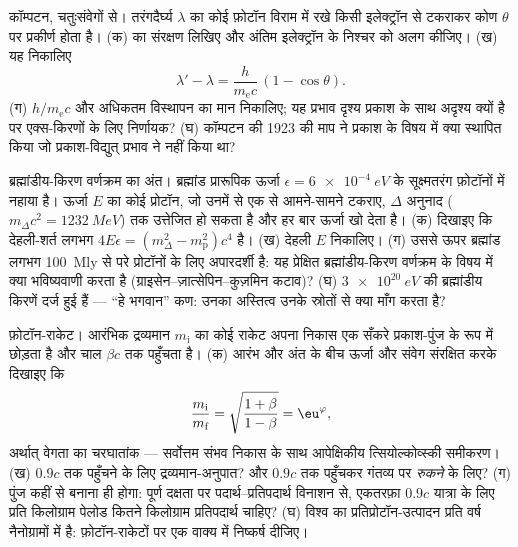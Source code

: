 \begin{exercise}[$\star\star\star$]\label{exo:b3:relativistic-dynamics:10}
कॉम्पटन, चतुःसंवेगों से। तरंगदैर्घ्य $\lambda$ का कोई फ़ोटॉन विराम में
रखे किसी इलेक्ट्रॉन से टकराकर कोण $\theta$ पर प्रकीर्ण होता है। (क)
 का संरक्षण लिखिए और अंतिम इलेक्ट्रॉन के
निश्चर को अलग कीजिए। (ख) यह निकालिए
\[
\lambda' - \lambda = \frac{h}{m_{\text{e}}c}\,(1 - \cos\theta) .
\]
(ग) $h/m_{\text{e}}c$ और अधिकतम विस्थापन का मान निकालिए; यह प्रभाव
दृश्य प्रकाश के साथ अदृश्य क्यों है पर एक्स-किरणों के लिए निर्णायक?
(घ) कॉम्पटन की 1923 की माप ने प्रकाश के विषय में क्या स्थापित किया जो
प्रकाश-विद्युत् प्रभाव ने नहीं किया था?
\end{exercise}

\begin{exercise}[$\star\star\star$]\label{exo:b3:relativistic-dynamics:11}
ब्रह्मांडीय-किरण वर्णक्रम का अंत। ब्रह्मांड प्रारूपिक ऊर्जा
$\epsilon = \qty{6e-4}{eV}$ के सूक्ष्मतरंग फ़ोटॉनों में नहाया है।
ऊर्जा $E$ का कोई प्रोटॉन, जो उनमें से एक से आमने-सामने टकराए,
$\Delta$ अनुनाद ($m_\Delta c^2 = \qty{1232}{MeV}$) तक उत्तेजित हो
सकता है और हर बार ऊर्जा खो देता है। (क) दिखाइए कि देहली-शर्त लगभग
$4E\epsilon =
(m_\Delta^2 - m_{\text{p}}^2)c^4$ है। (ख) देहली $E$ निकालिए।
(ग) उससे ऊपर ब्रह्मांड लगभग \qty{100}{Mly} से परे प्रोटॉनों के लिए
अपारदर्शी है: यह प्रेक्षित ब्रह्मांडीय-किरण वर्णक्रम के विषय में क्या
भविष्यवाणी करता है (ग्राइसेन--ज़ात्सेपिन--कुज़मिन कटाव)? (घ)
$\qty{3e20}{eV}$ की ब्रह्मांडीय किरणें दर्ज हुई हैं --- ``हे भगवान''
कण: उनका अस्तित्व उनके स्रोतों से क्या माँग करता है?
\end{exercise}

\begin{exercise}[$\star\star\star$]\label{exo:b3:relativistic-dynamics:12}
फ़ोटॉन-राकेट। आरंभिक द्रव्यमान $m_{\text{i}}$ का कोई राकेट अपना
निकास एक सँकरे प्रकाश-पुंज के रूप में छोड़ता है और चाल $\beta c$ तक
पहुँचता है। (क) आरंभ और अंत के बीच ऊर्जा और संवेग संरक्षित करके दिखाइए कि
\[
\frac{m_{\text{i}}}{m_{\text{f}}} =
\sqrt{\frac{1 + \beta}{1 - \beta}} = \eu^{\varphi} ,
\]
अर्थात् वेगता का चरघातांक --- सर्वोत्तम संभव निकास के साथ आपेक्षिकीय
त्सियोल्कोव्स्की समीकरण। (ख) $0.9c$ तक पहुँचने के लिए द्रव्यमान-अनुपात?
और $0.9c$ तक पहुँचकर गंतव्य पर \emph{रुकने} के लिए? (ग) पुंज कहीं से
बनाना ही होगा: पूर्ण दक्षता पर पदार्थ--प्रतिपदार्थ विनाशन से,
एकतरफ़ा $0.9c$ यात्रा के लिए प्रति किलोग्राम पेलोड कितने किलोग्राम
प्रतिपदार्थ चाहिए? (घ) विश्व का प्रतिप्रोटॉन-उत्पादन प्रति वर्ष
नैनोग्रामों में है: फ़ोटॉन-राकेटों पर एक वाक्य में निष्कर्ष दीजिए।
\end{exercise}


